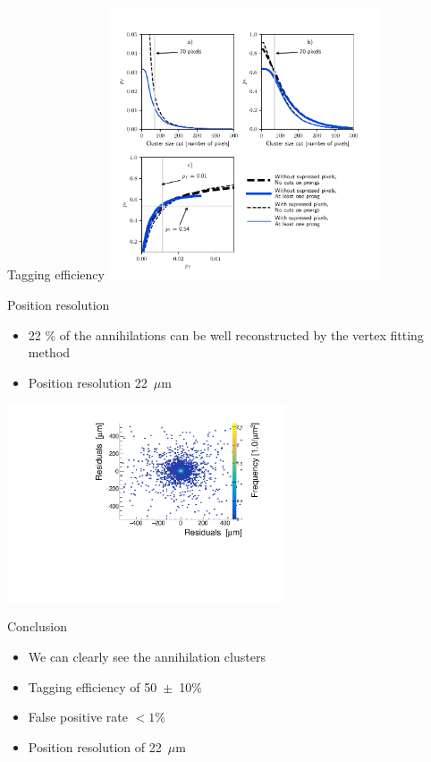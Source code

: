 \documentclass{beamer}
\begin{document}
\begin{frame}{\centering Tagging efficiency}
  \centering
    \includegraphics[width=3.17in]{fig/taggingEfficency}
\end{frame}
\begin{frame}{Position resolution}
  \begin{block}{\begin{itemize}
        \setlength{\itemindent}{2.5cm}
      \item{22 \% of the annihilations can be well reconstructed by the vertex fitting method}
      \item{Position resolution 22~$\mu$m}
      \end{itemize}
      }
      \centering
      \includegraphics[width=3.25in]{fig/2dfit.pdf}
  \end{block}
\end{frame}

\begin{frame}{Conclusion}
  \begin{itemize}
  \item{We can clearly see the annihilation clusters}
  \item{Tagging efficiency of 50~$\pm$~10\%}
  \item{False positive rate $< 1$\%}
  \item{Position resolution of 22~$\mu$m}
  \end{itemize}
\end{frame}
  
\end{document}
